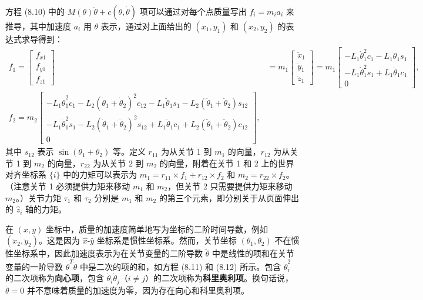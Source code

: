\documentclass[12pt,a4paper]{article}
\begin{document}
方程 (8.10) 中的 $M(\theta)\ddot{\theta} + c(\theta, \dot{\theta})$ 项可以通过对每个点质量写出 $f_i = m_i a_i$ 来推导，其中加速度 $a_i$ 用 $\theta$ 表示，通过对上面给出的 $(x_1, y_1)$ 和 $(x_2, y_2)$ 的表达式求导得到：
\begin{align}
f_1 = \begin{bmatrix} f_{x1} \\ f_{y1} \\ f_{z1} \end{bmatrix} &= m_1 \begin{bmatrix} \ddot{x}_1 \\ \ddot{y}_1 \\ \ddot{z}_1 \end{bmatrix} = m_1 \begin{bmatrix} -L_1 \dot{\theta}_1^2 c_1 - L_1 \ddot{\theta}_1 s_1 \\ -L_1 \dot{\theta}_1^2 s_1 + L_1 \ddot{\theta}_1 c_1 \\ 0 \end{bmatrix}, \label{eq:8.11} \\
f_2 = m_2 \begin{bmatrix} -L_1 \dot{\theta}_1^2 c_1 - L_2 (\dot{\theta}_1 + \dot{\theta}_2)^2 c_{12} - L_1 \ddot{\theta}_1 s_1 - L_2 (\ddot{\theta}_1 + \ddot{\theta}_2)s_{12} \\ -L_1 \dot{\theta}_1^2 s_1 - L_2 (\dot{\theta}_1 + \dot{\theta}_2)^2 s_{12} + L_1 \ddot{\theta}_1 c_1 + L_2 (\ddot{\theta}_1 + \ddot{\theta}_2)c_{12} \\ 0 \end{bmatrix}, \label{eq:8.12}
\end{align}
其中 $s_{12}$ 表示 $\sin(\theta_1 + \theta_2)$ 等。定义 $r_{11}$ 为从关节 1 到 $m_1$ 的向量，$r_{12}$ 为从关节 1 到 $m_2$ 的向量，$r_{22}$ 为从关节 2 到 $m_2$ 的向量，附着在关节 1 和 2 上的世界对齐坐标系 $\{i\}$ 中的力矩可以表示为 $m_1 = r_{11} \times f_1 + r_{12} \times f_2$ 和 $m_2 = r_{22} \times f_2$。（注意关节 1 必须提供力矩来移动 $m_1$ 和 $m_2$，但关节 2 只需要提供力矩来移动 $m_2$。）关节力矩 $\tau_1$ 和 $\tau_2$ 分别是 $m_1$ 和 $m_2$ 的第三个元素，即分别关于从页面伸出的 $\hat{z}_i$ 轴的力矩。

在 $(x, y)$ 坐标中，质量的加速度简单地写为坐标的二阶时间导数，例如 $(\ddot{x}_2, \ddot{y}_2)$。这是因为 $\hat{x}$-$\hat{y}$ 坐标系是惯性坐标系。然而，关节坐标 $(\theta_1, \theta_2)$ 不在惯性坐标系中，因此加速度表示为在关节变量的二阶导数 $\ddot{\theta}$ 中是线性的项和在关节变量的一阶导数 $\dot{\theta}^T \dot{\theta}$ 中是二次的项的和，如方程 (8.11) 和 (8.12) 所示。包含 $\dot{\theta}_i^2$ 的二次项称为\textbf{向心项}，包含 $\dot{\theta}_i \dot{\theta}_j$（$i \neq j$）的二次项称为\textbf{科里奥利项}。换句话说，$\ddot{\theta} = 0$ 并不意味着质量的加速度为零，因为存在向心和科里奥利项。
\end{document}
